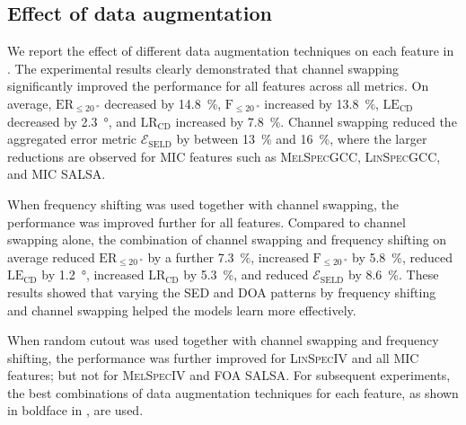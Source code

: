 \documentclass[journal]{IEEEtran}
\newcommand{\ER}{$\text{ER}_{\le \SI{20}{\degree}}$\xspace}
\newcommand{\Fone}{$\text{F}_{\le \SI{20}{\degree}}$\xspace}
\newcommand{\LE}{$\text{LE}_\text{CD}$\xspace}
\newcommand{\LR}{$\text{LR}_\text{CD}$\xspace}
\newcommand{\Eseld}{$\mathcal{E}_\text{SELD}$\xspace}
\begin{document}
\subsection{Effect of data augmentation}

We report the effect of different data augmentation techniques on each feature in . The experimental results clearly demonstrated that channel swapping significantly improved the performance for all features across all metrics. On average, \ER decreased by \SI{14.8}{\percent}, \Fone increased by \SI{13.8}{\percent}, \LE decreased by \SI{2.3}{\degree}, and \LR increased by \SI{7.8}{\percent}. Channel swapping reduced the aggregated error metric \Eseld by between \SI{13}{\percent} and \SI{16}{\percent}, where the larger reductions are observed for MIC features such as \textsc{MelSpecGCC}, \textsc{LinSpecGCC}, and MIC SALSA.  

When frequency shifting was used together with channel swapping, the performance was improved further for all features. Compared to channel swapping alone, the combination of channel swapping and frequency shifting on average reduced \ER by a further \SI{7.3}{\percent}, increased \Fone by \SI{5.8}{\percent}, reduced \LE by \SI{1.2}{\degree}, increased \LR by \SI{5.3}{\percent}, and reduced \Eseld by \SI{8.6}{\percent}. These results showed that varying the SED and DOA patterns by frequency shifting and channel swapping helped the models learn more effectively. 

When random cutout was used together with channel swapping and frequency shifting, the performance was further improved for \textsc{LinSpecIV} and all MIC features; but not for \textsc{MelSpecIV} and FOA SALSA. For subsequent experiments, the best combinations of data augmentation techniques for each feature, as shown in boldface in , are used.
\end{document}
